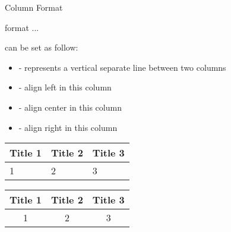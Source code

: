 \begin{frame}[fragile]{Column Format}

\begin{command}
\begin{LCL}
\begin{tabular}{format}
...
\end{tabular}
\end{LCL}
\end{command}

	 can be set as follow:
	\begin{itemize}
		\item \packagename{|} - represents a vertical separate line between two columns
		\item {} - align left in this column
		\item {} - align center in this column
		\item {} - align right in this column
	\end{itemize}
	\begin{example}
		\begin{minipage}{0.48\linewidth}
			\centering
			 \medskip
			
        	\begin{tabular}{|l|l|l|}
        		\hline
        		Title 1 & Title 2 & Title 3 \\
        		\hline
        		1 & 2 &3 \\
        		\hline
        	\end{tabular}
		\end{minipage}
		\begin{minipage}{0.48\linewidth}
			\centering
			 \medskip
			
        	\begin{tabular}{||c|cc||}
        		\hline
        		Title 1 & Title 2 & Title 3 \\
        		\hline
        		1 & 2 &3 \\
        		\hline
        	\end{tabular}
		\end{minipage}
    \end{example}	
\end{frame}

